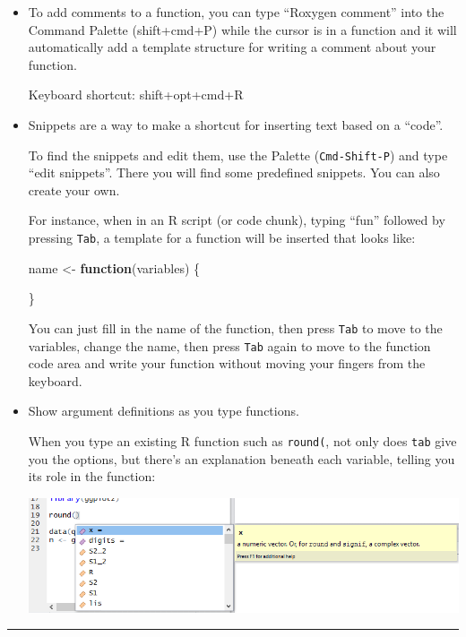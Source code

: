 \documentclass[
  a4paper,
  twoside,
  openright]{book}
\newenvironment{Shaded}{\begin{snugshade}}{\end{snugshade}}
\newcommand{\ControlFlowTok}[1]{\textcolor[rgb]{0.13,0.29,0.53}{\textbf{#1}}}
\newcommand{\NormalTok}[1]{#1}
\newcommand{\OtherTok}[1]{\textcolor[rgb]{0.56,0.35,0.01}{#1}}
\theoremstyle{definition}
\theoremstyle{definition}
\theoremstyle{definition}
\theoremstyle{definition}
\theoremstyle{remark}
\begin{document}
\begin{itemize}
\item
  To add comments to a function, you can type ``Roxygen comment'' into the Command Palette (shift+cmd+P) while the cursor is in a function and it will automatically add a template structure for writing a comment about your function.

  Keyboard shortcut: shift+opt+cmd+R
\item
  Snippets are a way to make a shortcut for inserting text based on a ``code''.

  To find the snippets and edit them, use the Palette (\texttt{Cmd-Shift-P}) and type ``edit snippets''. There you will find some predefined snippets. You can also create your own.

  For instance, when in an R script (or code chunk), typing ``fun'' followed by pressing \texttt{Tab}, a template for a function will be inserted that looks like:

\begin{Shaded}
\begin{Highlighting}[]
\NormalTok{name }\OtherTok{\textless{}{-}} \ControlFlowTok{function}\NormalTok{(variables) \{}

\NormalTok{\}}
\end{Highlighting}
\end{Shaded}

  You can just fill in the name of the function, then press \texttt{Tab} to move to the variables, change the name, then press \texttt{Tab} again to move to the function code area and write your function without moving your fingers from the keyboard.
\item
  Show argument definitions as you type functions.

  When you type an existing R function such as \texttt{round(}, not only does {\texttt{tab}} give you the options, but there's an explanation beneath each variable, telling you its role in the function:

  \includegraphics[width=1\linewidth]{images/func help}
\end{itemize}

\begin{center}\rule{0.5\linewidth}{0.5pt}\end{center}
\end{document}
